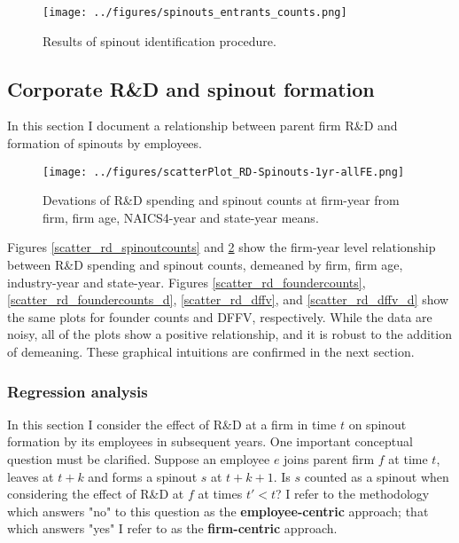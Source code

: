 \documentclass[11pt,english]{article}
\theoremstyle{remark}
\begin{document}
\begin{figure}[p]
	\centering
	\texttt{[image: ../figures/spinouts\_entrants\_counts.png]}
	\caption{Results of spinout identification procedure.}
	\label{spinout_entrants_counts_unweighted}
\end{figure}


\subsection{Corporate R\&D and spinout formation}

In this section I document a relationship between parent firm R\&D and formation of spinouts by employees.

\begin{figure}[p]
	\centering
	\texttt{[image: ../figures/scatterPlot\_RD-Spinouts-1yr-allFE.png]}
	\caption{Devations of R\&D spending and spinout counts at firm-year from firm, firm age, NAICS4-year and state-year means.}
	\label{scatter_rd_spinoutcounts_d}
\end{figure}

Figures \ref{scatter_rd_spinoutcounts} and \ref{scatter_rd_spinoutcounts_d} show the firm-year level relationship between R\&D spending and spinout counts, demeaned by firm, firm age, industry-year and state-year. Figures \ref{scatter_rd_foundercounts}, \ref{scatter_rd_foundercounts_d}, \ref{scatter_rd_dffv}, and \ref{scatter_rd_dffv_d} show the same plots for founder counts and DFFV, respectively. While the data are noisy, all of the plots show a positive relationship, and it is robust to the addition of demeaning. These graphical intuitions are confirmed in the next section.

\subsubsection{Regression analysis}

In this section I consider the effect of R\&D at a firm in time $t$ on spinout formation by its employees in subsequent years. One important conceptual question must be clarified. Suppose an employee $e$ joins parent firm $f$ at time $t$, leaves at $t+k$ and forms a spinout $s$ at $t+k+1$. Is $s$ counted as a spinout when considering the effect of R\&D at $f$ at times $t' < t$? I refer to the methodology which answers "no" to this question as the \textbf{employee-centric} approach; that which answers "yes" I refer to as the \textbf{firm-centric} approach. 
\end{document}
